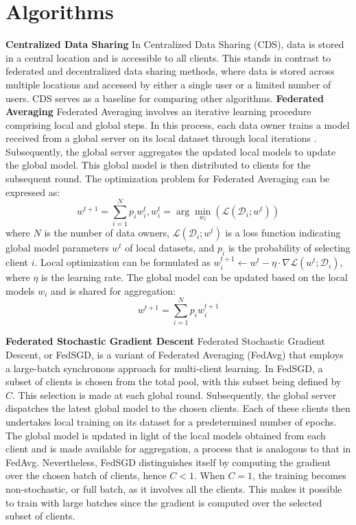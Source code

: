 
\section{Algorithms}
\textbf{Centralized Data Sharing} In Centralized Data Sharing (CDS), data is stored in a central location and is accessible to all clients. This stands in contrast to federated and decentralized data sharing methods, where data is stored across multiple locations and accessed by either a single user or a limited number of users. CDS serves as a baseline for comparing other algorithms.
\textbf{Federated Averaging} Federated Averaging involves an iterative learning procedure comprising local and global steps. In this process, each data owner trains a model received from a global server on its local dataset through local iterations \cite{mcmahan2017communication}. Subsequently, the global server aggregates the updated local models to update the global model. This global model is then distributed to clients for the subsequent round. The optimization problem for Federated Averaging can be expressed as:
\begin{equation}
w^{t+1} = \sum\limits_{i=1}^{N}{p_{i} w_{i}^{t}} , w_{i}^{t}=\arg\min\limits_{w_{i}}{\left(\mathcal{L}(\mathcal{D}_{i};w^{t})\right)}
\end{equation}
where $N$ is the number of data owners, $\mathcal{L}(\mathcal{D}_{i};w^{t})$ is a loss function indicating global model parameters  $w^{t}$ of local datasets, and $p_{i}$ is the probability of selecting client $i$. 
Local optimization can be formulated as $w_{i}^{t+1} \leftarrow w^{t}-\eta\cdot \nabla \mathcal{L}(w^{t};\mathcal{D}_{i})$, where 
 $\eta$ is the learning rate. The global model can be updated based on the local models $w_{i}$ and is shared for aggregation: 
\begin{equation}
w^{t+1} = \sum\limits_{i=1}^{N}{p_{i} w_{i}^{t+1}}
\end{equation}

\textbf{Federated Stochastic Gradient Descent} Federated Stochastic Gradient Descent, or FedSGD\cite{chai2020fedeval}, is a variant of Federated Averaging (FedAvg) that employs a large-batch synchronous approach for multi-client learning. In FedSGD, a subset of clients is chosen from the total pool, with this subset being defined by $C$. This selection is made at each global round. Subsequently, the global server dispatches the latest global model to the chosen clients. Each of these clients then undertakes local training on its dataset for a predetermined number of epochs. The global model is updated in light of the local models obtained from each client and is made available for aggregation, a process that is analogous to that in FedAvg. Nevertheless, FedSGD distinguishes itself by computing the gradient over the chosen batch of clients, hence $C < 1$. When $C = 1$, the training becomes non-stochastic, or full batch, as it involves all the clients. This makes it possible to train with large batches since the gradient is computed over the selected subset of clients.

